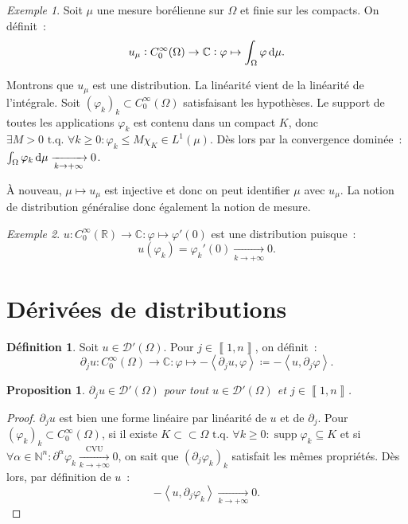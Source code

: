 \documentclass{report}
\DeclareMathOperator{\supp}{supp}
\newcommand{\C}{{\mathbb C}}
\newcommand{\R}{{\mathbb R}}
\newcommand{\N}{{\mathbb N}}
\newcommand{\scpr}[2]{\left\langle#1, #2\right\rangle}
\newcommand{\tq}{\text{ t.q. }}
\newcommand{\st}{\tq}
\newcommand{\pinfty}{{+\infty}}
\newcommand{\intint}[2]{{\left\llbracket#1, #2\right\rrbracket}}
\newtheorem{prp}[thm]{Proposition}
\theoremstyle{definition}
\newtheorem{déf}[thm]{Définition}
\theoremstyle{remark}
\newtheorem{ex}{Exemple}[chapter]
\begin{document}
\begin{ex}
Soit $\mu$ une mesure borélienne sur $\Omega$ et finie sur les compacts. On définit~:
\[u_\mu : C^\infty_0(\Omega) \to \C : \varphi \mapsto \int_\Omega\varphi\dif\mu.\]

Montrons que $u_\mu$ est une distribution. La linéarité vient de la linéarité de l'intégrale. Soit $(\varphi_k)_k \subset C^\infty_0(\Omega)$ satisfaisant les hypothèses.
Le support de toutes les applications $\varphi_k$ est contenu dans un compact $K$, donc $\exists M > 0 \st \forall k \geq 0 : \varphi_k \leq M\chi_K \in L^1(\mu)$.
Dès lors par la convergence dominée~: $\int_\Omega\varphi_k\dif\mu \xrightarrow[k \to \pinfty]{} 0$.

À nouveau, $\mu \mapsto u_\mu$ est injective et donc on peut identifier $\mu$ avec $u_\mu$. La notion de distribution généralise donc également la notion de mesure.
\end{ex}

\begin{ex}
$u : C^\infty_0(\R) \to \C : \varphi \mapsto \varphi'(0)$ est une distribution puisque~:
\[u(\varphi_k) = \varphi_k'(0) \xrightarrow[k \to \pinfty]{} 0.\]
\end{ex}

\section{Dérivées de distributions}

\begin{déf} Soit $u \in \mathcal D'(\Omega)$. Pour $j \in \intint 1n$, on définit~:
\[\partial_ju : C^\infty_0(\Omega) \to \C : \varphi \mapsto -\scpr {\partial_ju}\varphi \coloneqq -\scpr u{\partial_j\varphi}.\]
\end{déf}

\begin{prp}\label{prp:dérivation distribution} $\partial_ju \in \mathcal D'(\Omega)$ pour tout $u \in \mathcal D'(\Omega)$ et $j \in \intint 1n$.
\end{prp}

\begin{proof} $\partial_ju$ est bien une forme linéaire par linéarité de $u$ et de $\partial_j$. Pour $(\varphi_k)_k \subset C^\infty_0(\Omega)$, si il existe
$K \subset\subset \Omega \st \forall k \geq 0 : \supp \varphi_k \subseteq K$ et si $\forall \alpha \in \N^n : \partial^\alpha\varphi_k \xrightarrow[k \to \pinfty]{\text{CVU}} 0$,
on sait que $(\partial_j\varphi_k)_k$ satisfait les mêmes propriétés. Dès lors, par définition de $u$~:
\[-\scpr u{\partial_j\varphi_k} \xrightarrow[k \to \pinfty]{} 0.\]
\end{proof}
\end{document}
